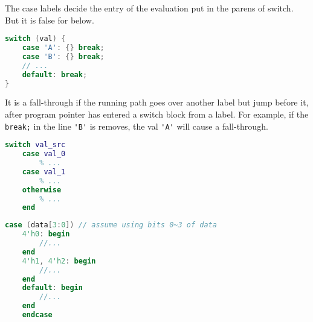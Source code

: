 
The case labels decide the entry of the evaluation put in the parens of switch. But it is false for below.

\begin{lstlisting}[language=C]
switch (val) {
	case 'A': {} break;
	case 'B': {} break;
	// ...
	default: break;
}
\end{lstlisting}


It is a fall-through if the running path goes over another label but jump before it, after program pointer has entered a switch block from a label.
For example, if the \verb|break;| in the line \verb|'B'| is removes, the val \verb|'A'| will cause a fall-through.

\begin{lstlisting}[language=MATLAB]
	switch val_src
	case val_0
		% ...
	case val_1
		% ...
	otherwise
		% ...
	end
\end{lstlisting}


\begin{lstlisting}[language=Verilog]
	case (data[3:0]) // assume using bits 0~3 of data
	4'h0: begin
		//...
	end
	4'h1, 4'h2: begin
		//...
	end
	default: begin
		//...
	end
	endcase
\end{lstlisting}



